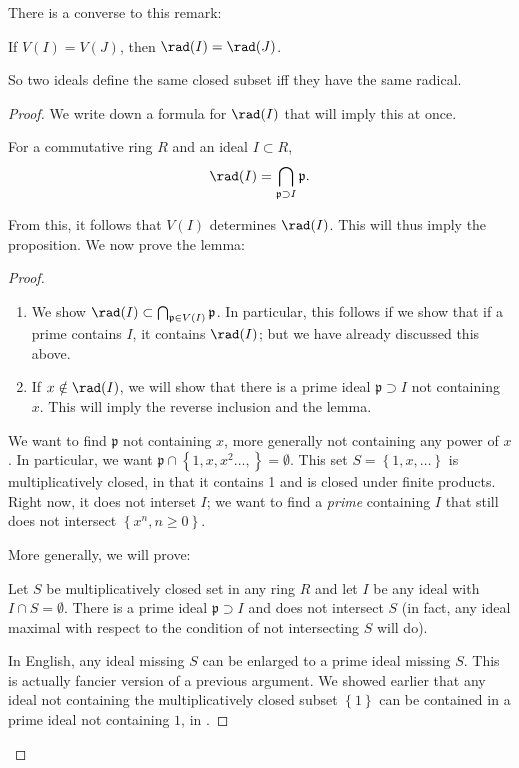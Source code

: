 There is a converse to this remark:
\begin{proposition} 
If $V(I) = V(J)$, then $\rad(I) = \rad(J)$. 
\end{proposition} 
So two ideals define the same closed subset iff they have the
same radical.
\begin{proof} 
We write down a formula for $\rad(I)$ that will imply this at
once.
\begin{lemma} \label{radprimescontaining} For a commutative ring $R$ and an
ideal $I \subset
R$,
\[ \rad(I) = \bigcap_{\mathfrak{p} \supset I} \mathfrak{p}.  \]
\end{lemma} 
From this, it follows that $V(I)$ determines $\rad(I)$. This
will thus imply
the proposition.  
We now prove the lemma:
\begin{proof} 
\begin{enumerate}
\item We show $\rad(I) \subset \bigcap_{\mathfrak{p} \in V(I)}
\mathfrak{p} $. In
particular, this follows if we show that if a prime contains
$I$, it contains $\rad(I)$; but we have already
discussed this above.  
\item If $x \notin \rad(I)$, we will show that there is a prime
ideal $\mathfrak{p}
\supset I$ not containing $x$. This will imply the reverse
inclusion and the
lemma.  
\end{enumerate}


We want to find $\mathfrak{p}$ not containing $x$, more
generally not
containing any power of $x$. In particular, we want
$\mathfrak{p} \cap \left\{1,
x, x^2 \dots, \right\} = \emptyset$. This set $S = \left\{1, x,
\dots\right\}$
is multiplicatively closed, in that it contains 1 and is closed
under
finite products. Right now, it does not interset $I$; we want to find
a
\emph{prime} containing $I$ that still does not intersect $\left\{x^n, n
\geq 0\right\}$.


More generally, we will prove:

\begin{sublemma}\label{sublemmamultclosed}
Let $S$ be multiplicatively closed set in any ring $R$ and let
$I$ be any ideal with $I \cap S =
\emptyset$. There is a prime ideal $\mathfrak{p} \supset I$ and
does not
intersect $S$ (in fact, any ideal maximal with respect to the condition of
not intersecting $S$ will do).  
\end{sublemma}
In English, any ideal missing $S$ can be enlarged to a prime
ideal missing $S$.
This is actually fancier version of a previous argument. We
showed earlier that any ideal not
containing the multiplicatively closed subset $\left\{1\right\}$
can be
contained in a prime ideal not containing $1$, in
.


\end{proof}
\end{proof}
